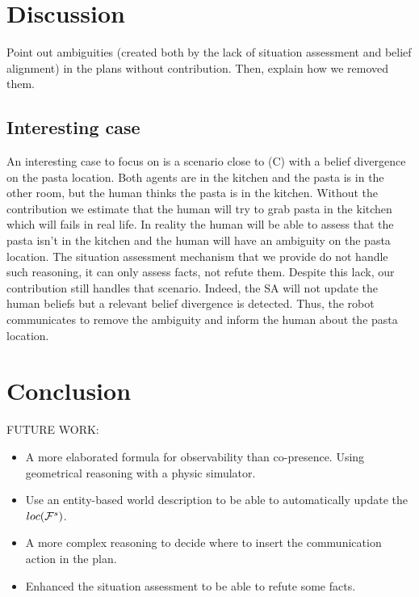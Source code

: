 \documentclass[letterpaper]{article} %
\begin{document}
\section{Discussion}

Point out ambiguities (created both by the lack of situation assessment and belief alignment) in the plans without contribution. Then, explain how we removed them. 

\subsection{Interesting case}

An interesting case to focus on is a scenario close to (C) with a belief divergence on the pasta location. Both agents are in the kitchen and the pasta is in the other room, but the human thinks the pasta is in the kitchen. Without the contribution we estimate that the human will try to grab pasta in the kitchen which will fails in real life. In reality the human will be able to assess that the pasta isn't in the kitchen and the human will have an ambiguity on the pasta location. The situation assessment mechanism that we provide do not handle such reasoning, it can only assess facts, not refute them. Despite this lack, our contribution still handles that scenario. Indeed, the SA will not update the human beliefs but a relevant belief divergence is detected. Thus, the robot communicates to remove the ambiguity and inform the human about the pasta location.  

\section{Conclusion}

FUTURE WORK:
\begin{itemize}
    \item A more elaborated formula for observability than co-presence. Using geometrical reasoning with a physic simulator.
    \item Use an entity-based world description to be able to automatically update the $loc(\mathcal{F}^{s}_{}{})$.
    \item A more complex reasoning to decide where to insert the communication action in the plan.
    \item Enhanced the situation assessment to be able to refute some facts.
\end{itemize}


\end{document}
